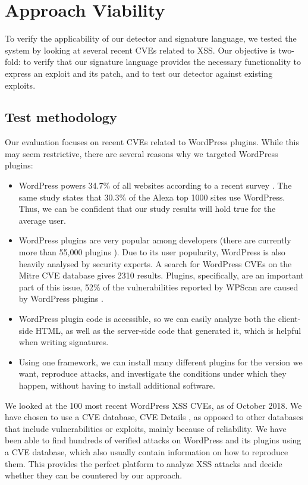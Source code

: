 \section{Approach Viability} \label{viability}

To verify the applicability of our detector and signature language, we tested the system by looking at several recent CVEs related to \ac{XSS}. Our objective is two-fold: to verify that our signature language provides the necessary functionality to express an exploit and its patch, and to test our detector against existing exploits.

\subsection{Test methodology} \label{methodology}

Our evaluation focuses on recent CVEs related to WordPress
plugins. While this may seem restrictive, there are several reasons
why we targeted WordPress plugins:
\begin{itemize}
	\item WordPress powers 34.7\% of all websites according to a recent survey  \cite{w3stats}. The same study states that 30.3\% of the Alexa top 1000 sites use WordPress. Thus, we can be confident that our study results will hold true for the average user.
	\item WordPress plugins are very popular among developers (there are currently more than 55,000 plugins \cite{wpplugins}). Due to its user popularity, WordPress is also heavily analysed by security experts. A search for WordPress CVEs on the Mitre CVE database \cite{cvemitre} gives 2310 results. Plugins, specifically, are an important part of this issue, 52\% of the vulnerabilities reported by WPScan are caused by WordPress plugins \cite{wpscan}.
	\item WordPress plugin code is accessible, so we can easily analyze both the client-side HTML, as well as the server-side code that generated it, which is helpful when writing signatures.
	\item Using one framework, we can install many different plugins for the version we want, reproduce attacks, and investigate the conditions under which they happen, without having to install additional software.
\end{itemize}

We looked at the 100 most recent WordPress \ac{XSS} CVEs, as of October 2018. We have chosen to use a CVE database, CVE Details \cite{cvedetails}, as opposed to other databases that include vulnerabilities or exploits, mainly because of reliability. We have been able to find hundreds of verified attacks on WordPress and its plugins using a CVE database, which also usually contain information on how to reproduce them. This provides the perfect platform to analyze \ac{XSS} attacks and decide whether they can be countered by our approach. 

